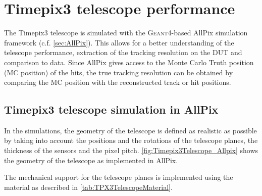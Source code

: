 \section{Timepix3 telescope performance}
\label{sec:telescopePerformance}

The Timepix3 telescope is simulated with the \textsc{Geant4}-based
AllPix simulation framework (c.f. \cref{sec:AllPix}). This allows for
a better understanding of the telescope performance, extraction of the
tracking resolution on the DUT and comparison to data. Since AllPix
gives access to the Monte Carlo Truth position (MC position) of the
hits, the true tracking resolution can be obtained by comparing the MC
position with the reconstructed track or hit positions.

\subsection{Timepix3 telescope simulation in AllPix}
In the simulations, the geometry of the telescope is defined as
realistic as possible by taking into account the positions and the
rotations of the telescope planes, the thickness of the sensors and
the pixel pitch. \cref{fig:Timepix3Telescope_Allpix} shows the
geometry of the telescope as implemented in AllPix.

The mechanical support for the telescope planes is implemented using
the material as described in \cref{tab:TPX3TelescopeMaterial}.



